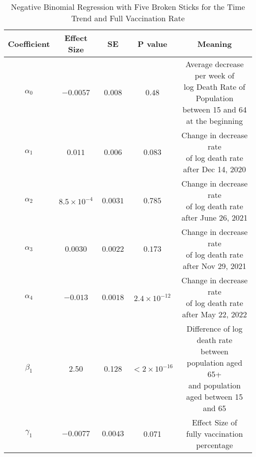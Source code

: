 \documentclass[12pt]{article}
\begin{document}
\begin{enumerate}[(a)]
	
	\begin{table}[htbp]
		\centering
		\begin{tabular}{ccccc}
			\toprule
			Coefficient & Effect Size & SE & P value & Meaning\\
			\midrule
			$\alpha_{0}$ & $-0.0057$ & $0.008$ & $0.48$ & \makecell{Average decrease per week of \\ log Death Rate of  Population \\ between 15 and 64 \\ at the beginning}\\
			\addlinespace[0.2cm]
			$\alpha_{1}$ & $0.011$ & $0.006$ & $0.083$& \makecell{Change in decrease rate \\ of log death rate\\ after Dec 14, 2020}\\
			\addlinespace[0.2cm]
			$\alpha_{2}$ & $8.5\times 10^{-4}$ & $0.0031$ & $0.785$& \makecell{Change in decrease rate \\ of log death rate\\ after June 26, 2021}\\
			\addlinespace[0.2cm]
			$\alpha_{3}$ & $0.0030$ & $0.0022$ & $0.173$& \makecell{Change in decrease rate \\ of log death rate\\ after Nov 29, 2021}\\
			\addlinespace[0.2cm]
			$\alpha_{4}$ & $-0.013$ & $0.0018$ & $2.4\times 10^{-12}$& \makecell{Change in decrease rate \\ of log death rate\\ after May 22, 2022}\\
			\addlinespace[0.2cm]
			$\beta_{1}$ & 2.50 & 0.128 & $<2\times 10^{-16}$ & \makecell{Difference of log death rate \\between population aged 65+ \\ and population aged between 15 and 65}\\
			\addlinespace[0.2cm]
			$\gamma_{1}$ & $-0.0077$ & $0.0043$ & 0.071 & \makecell{Effect Size of \\fully vaccination percentage}\\
			\bottomrule
		\end{tabular}
		\caption{Negative Binomial Regression with Five Broken Sticks for the Time Trend and Full Vaccination Rate}\label{sticknbfullvc}
	\end{table}	
	

\end{enumerate}
\end{document}
